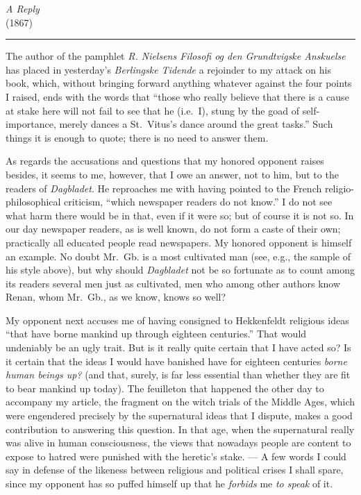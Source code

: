 \documentclass[12pt,a4paper,openany]{book}
\newcommand{\piecehead}[2]{\clearpage\phantomsection
  \addcontentsline{toc}{section}{#1}\markboth{#1}{#1}%
  \begin{center}\large #2\\[6pt]\rule{2cm}{0.4pt}\end{center}\par\medskip}
\newcommand{\opage}[1]{\marginnote{\footnotesize\textit{[#1]}}}
\begin{document}
\piecehead{A Reply}{\opage{98}\emph{A Reply}\\[2pt](1867)}
The author of the pamphlet \emph{R. Nielsens Filosofi og den Grundtvigske
Anskuelse} has placed in yesterday's \emph{Berlingske Tidende} a rejoinder
to my attack on his book, which, without bringing forward anything
whatever against the four points I raised, ends with the words that
``those who really believe that there is a cause at stake here will not
fail to see that he (i.e.\ I), stung by the goad of self-importance,
merely dances a St.\ Vitus's dance around the great tasks.'' Such things
it is enough to quote; there is no need to answer them.

As regards the accusations and questions that my honored opponent raises
besides, it seems to me, however, that I owe an answer, not to him, but
to the readers of \emph{Dagbladet}. He reproaches me with having pointed
to the French religio-philosophical criticism, ``which newspaper readers
do not know.'' I do not see what harm there would be in that, even if it
were so; but of course it is not so. In our day newspaper readers, as is
well known, do not form a caste of their own; practically all educated
people read newspapers. My honored opponent is himself an example. No
doubt Mr.~Gb. is a most cultivated man (see, e.g., the sample of his
style above), but why should \emph{Dagbladet} not be so fortunate as to
count among its readers several men just as cultivated, men who among
other authors know Renan, whom Mr.~Gb., as we know, knows so well?

My opponent next accuses me of having consigned to Hekkenfeldt religious
ideas ``that have borne mankind up through eighteen centuries.'' That
would undeniably be an ugly trait. But is it really quite certain that I
\opage{99}have acted so? Is it certain that the ideas I would have
banished have for eighteen centuries \emph{borne human beings up?} (and
that, surely, is far less essential than whether they are fit to bear
mankind up today). The feuilleton that happened the other day to
accompany my article, the fragment on the witch trials of the Middle
Ages, which were engendered precisely by the supernatural ideas that I
dispute, makes a good contribution to answering this question. In that
age, when the supernatural really was alive in human consciousness, the
views that nowadays people are content to expose to hatred were punished
with the heretic's stake. --- A few words I could say in defense of the
likeness between religious and political crises I shall spare, since my
opponent has so puffed himself up that he \emph{forbids} me \emph{to speak}
of it.
\end{document}
